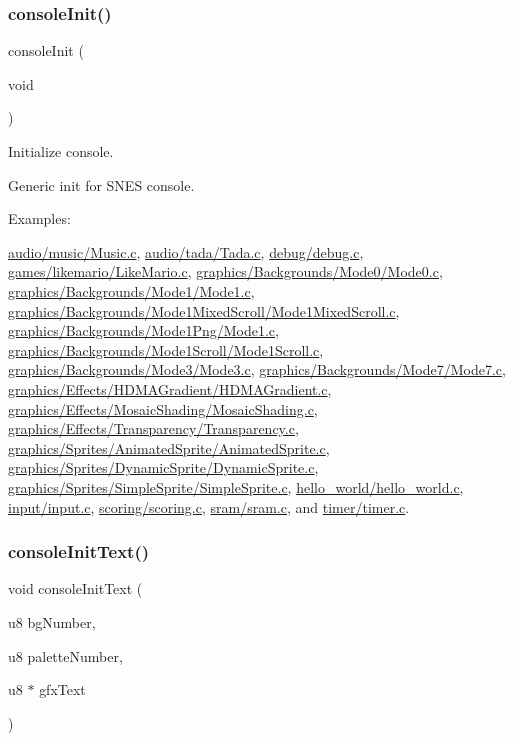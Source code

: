 \subsubsection{\texorpdfstring{console\+Init()}{consoleInit()}}
{\footnotesize\ttfamily console\+Init (\begin{DoxyParamCaption}\item[{void}]{ }\end{DoxyParamCaption})}



Initialize console. 

Generic init for S\+N\+ES console. \begin{Desc}
\item[Examples\+: ]\par
\hyperlink{a00392}{audio/music/\+Music.\+c}, \hyperlink{a00394}{audio/tada/\+Tada.\+c}, \hyperlink{a00396}{debug/debug.\+c}, \hyperlink{a00390}{games/likemario/\+Like\+Mario.\+c}, \hyperlink{a00360}{graphics/\+Backgrounds/\+Mode0/\+Mode0.\+c}, \hyperlink{a00362}{graphics/\+Backgrounds/\+Mode1/\+Mode1.\+c}, \hyperlink{a00368}{graphics/\+Backgrounds/\+Mode1\+Mixed\+Scroll/\+Mode1\+Mixed\+Scroll.\+c}, \hyperlink{a00364}{graphics/\+Backgrounds/\+Mode1\+Png/\+Mode1.\+c}, \hyperlink{a00366}{graphics/\+Backgrounds/\+Mode1\+Scroll/\+Mode1\+Scroll.\+c}, \hyperlink{a00370}{graphics/\+Backgrounds/\+Mode3/\+Mode3.\+c}, \hyperlink{a00372}{graphics/\+Backgrounds/\+Mode7/\+Mode7.\+c}, \hyperlink{a00374}{graphics/\+Effects/\+H\+D\+M\+A\+Gradient/\+H\+D\+M\+A\+Gradient.\+c}, \hyperlink{a00376}{graphics/\+Effects/\+Mosaic\+Shading/\+Mosaic\+Shading.\+c}, \hyperlink{a00378}{graphics/\+Effects/\+Transparency/\+Transparency.\+c}, \hyperlink{a00382}{graphics/\+Sprites/\+Animated\+Sprite/\+Animated\+Sprite.\+c}, \hyperlink{a00384}{graphics/\+Sprites/\+Dynamic\+Sprite/\+Dynamic\+Sprite.\+c}, \hyperlink{a00380}{graphics/\+Sprites/\+Simple\+Sprite/\+Simple\+Sprite.\+c}, \hyperlink{a00358}{hello\+\_\+world/hello\+\_\+world.\+c}, \hyperlink{a00386}{input/input.\+c}, \hyperlink{a00400}{scoring/scoring.\+c}, \hyperlink{a00398}{sram/sram.\+c}, and \hyperlink{a00388}{timer/timer.\+c}.\end{Desc}
\mbox{\label{a00290_a458fa049800e12429ca0ba401e513746}} 
\subsubsection{\texorpdfstring{console\+Init\+Text()}{consoleInitText()}}
{\footnotesize\ttfamily void console\+Init\+Text (\begin{DoxyParamCaption}\item[{u8}]{bg\+Number,  }\item[{u8}]{palette\+Number,  }\item[{u8 $\ast$}]{gfx\+Text }\end{DoxyParamCaption})}



